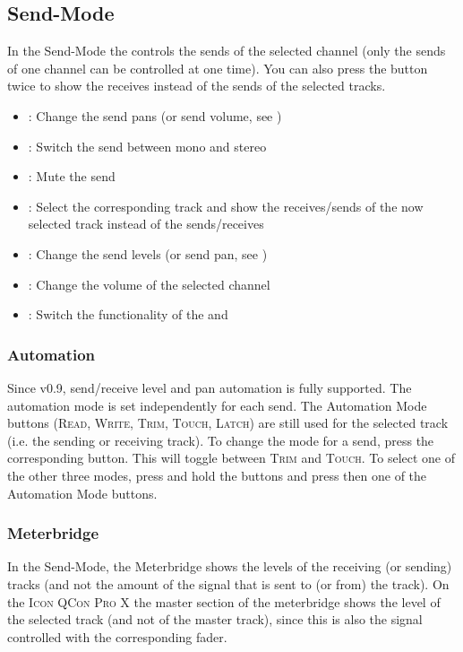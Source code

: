 \subsection{Send-Mode}\label{sendmode}

In the Send-Mode the \fs controls the sends of the
selected channel (only the sends of one  channel can be
controlled at one time). You can also press the \send button
twice to show the receives instead of the sends of the selected
tracks.

\begin{itemize}
\item \vpots: Change the send pans (or send volume, see \flip)
\item \solo: Switch the send between mono and stereo
\item \mute: Mute the send
\item \select: Select the corresponding track and show the receives/sends of
the now selected track instead of the sends/receives
\item \faders: Change the send levels (or send pan, see \flip)

\item \mfader: Change the volume of the selected channel

\item \flip: Switch the functionality of the \faders and \vpots
\end{itemize}

\subsubsection{Automation}\label{sendautomation}

Since v0.9, send/receive level and pan automation is fully
supported. The automation mode is set independently for each
send. The Automation Mode buttons (\textsc{Read, Write, Trim, Touch,
  Latch}) are still used for the selected track (i.e. the sending or
receiving track). To change the mode for a send, press the corresponding
\rec button. This will toggle between \textsc{Trim} and
\textsc{Touch}. To select one of the other three modes, press and hold
the \rec buttons and press then one of the Automation Mode buttons.

\subsubsection{Meterbridge}
In the Send-Mode, the Meterbridge shows the levels of the receiving
(or sending) tracks (and not the amount of the signal that is sent to
(or from) the track). On the \textsc{Icon QCon Pro X} the master
section of the meterbridge shows the level of the selected track (and
not of the master track), since this is also the signal controlled with
the corresponding fader.

